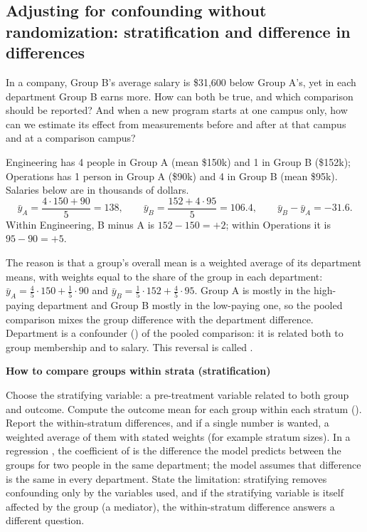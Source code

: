 \documentclass[10pt]{scrartcl}
\newenvironment{howto}[1]{\begin{mdframed}[style=howtostyle]{\color{NavyBlue}\textbf{#1}}\par\vspace{2pt}}{\end{mdframed}}
\begin{document}
\subsection{Adjusting for confounding without randomization: stratification and difference in differences}

\begin{qbox}
  In a company, Group B's average salary is \$31{,}600 below Group A's, yet in each department Group B earns more. How can both be true, and which comparison should be reported? And when a new program starts at one campus only, how can we estimate its effect from measurements before and after at that campus and at a comparison campus?
\end{qbox}

\begin{example*}
Engineering has 4 people in Group A (mean \$150k) and 1 in Group B (\$152k); Operations has 1 person in Group A (\$90k) and 4 in Group B (mean \$95k). Salaries below are in thousands of dollars.
\[
  \bar y_A = \frac{4\cdot150 + 90}{5} = 138, \qquad \bar y_B = \frac{152 + 4\cdot 95}{5} = 106.4, \qquad \bar y_B - \bar y_A = -31.6.
\]
Within Engineering, B minus A is $152-150 = +2$; within Operations it is $95-90 = +5$.
\end{example*}
The reason is that a group's overall mean is a weighted average of its department means, with weights equal to the share of the group in each department: $\bar y_A = \tfrac45\cdot150 + \tfrac15\cdot90$ and $\bar y_B = \tfrac15\cdot152 + \tfrac45\cdot95$. Group A is mostly in the high-paying department and Group B mostly in the low-paying one, so the pooled comparison mixes the group difference with the department difference. Department is a confounder () of the pooled comparison: it is related both to group membership and to salary. This reversal is called .

\begin{howto}{How to compare groups within strata (stratification)}
\begin{steps}
  \ii Choose the stratifying variable: a pre-treatment variable related to both group and outcome.
  \ii Compute the outcome mean for each group within each stratum ().
  \ii Report the within-stratum differences, and if a single number is wanted, a weighted average of them with stated weights (for example stratum sizes).
  \ii In a regression , the coefficient of  is the difference the model predicts between the groups for two people in the same department; the model assumes that difference is the same in every department.
  \ii State the limitation: stratifying removes confounding only by the variables used, and if the stratifying variable is itself affected by the group (a mediator), the within-stratum difference answers a different question.
\end{steps}
\end{howto}
\end{document}
